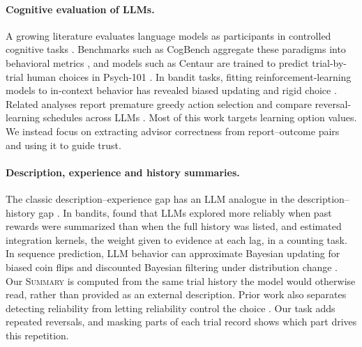 \documentclass[letterpaper]{article} %
\newcommand{\Summary}{\textsc{Summary}}
\begin{document}
\paragraph{Cognitive evaluation of LLMs.} A growing literature evaluates language models as participants in controlled cognitive tasks \citep{binz2023using}. Benchmarks such as CogBench aggregate these paradigms into behavioral metrics \citep{codaforno2024cogbench}, and models such as Centaur are trained to predict trial-by-trial human choices in Psych-101 \citep{binz2025foundation}. In bandit tasks, fitting reinforcement-learning models to in-context behavior has revealed biased updating and rigid choice \citep{schubert2024incontext,hayes2024biased,wang2026rigidity}. Related analyses report premature greedy action selection \citep{schmied2025greedy} and compare reversal-learning schedules across LLMs \citep{wang2026comparative,li2025reflectionbench}. Most of this work targets learning option values. We instead focus on extracting advisor correctness from report--outcome pairs and using it to guide trust.

\paragraph{Description, experience and history summaries.} The classic description--experience gap \citep{hertwig2004decisions,wulff2018metaanalytic} has an LLM analogue in the description--history gap \citep{ge2026dhgap}. In bandits, \citet{krishnamurthy2024explore} found that LLMs explored more reliably when past rewards were summarized than when the full history was listed, and \citet{xue2026counting} estimated integration kernels, the weight given to evidence at each lag, in a counting task. In sequence prediction, LLM behavior can approximate Bayesian updating for biased coin flips \citep{gupta2025coinflips} and discounted Bayesian filtering under distribution change \citep{zhang2025discounted}. Our \Summary{} is computed from the same trial history the model would otherwise read, rather than provided as an external description. Prior work also separates detecting reliability from letting reliability control the choice \citep{zhang2026evidence}. Our task adds repeated reversals, and masking parts of each trial record shows which part drives this repetition.
\end{document}
